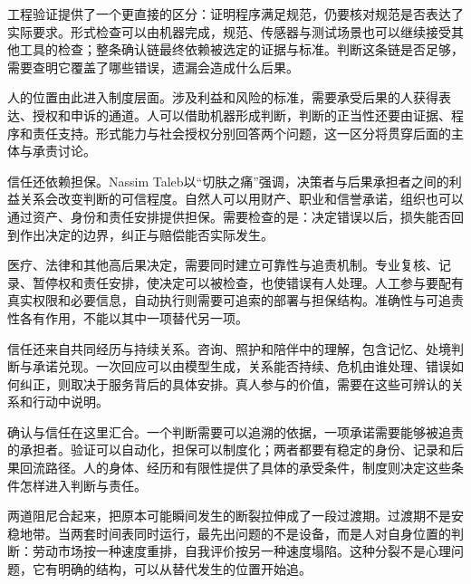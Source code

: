 工程验证提供了一个更直接的区分：证明程序满足规范，仍要核对规范是否表达了实际要求。形式检查可以由机器完成，规范、传感器与测试场景也可以继续接受其他工具的检查；整条确认链最终依赖被选定的证据与标准。判断这条链是否足够，需要查明它覆盖了哪些错误，遗漏会造成什么后果。

人的位置由此进入制度层面。涉及利益和风险的标准，需要承受后果的人获得表达、授权和申诉的通道。人可以借助机器形成判断，判断的正当性还要由证据、程序和责任支持。形式能力与社会授权分别回答两个问题，这一区分将贯穿后面的主体与承责讨论。


信任还依赖担保。Nassim Taleb以“切肤之痛”强调，决策者与后果承担者之间的利益关系会改变判断的可信程度。自然人可以用财产、职业和信誉承诺，组织也可以通过资产、身份和责任安排提供担保。需要检查的是：决定错误以后，损失能否回到作出决定的边界，纠正与赔偿能否实际发生。

医疗、法律和其他高后果决定，需要同时建立可靠性与追责机制。专业复核、记录、暂停权和责任安排，使决定可以被检查，也使错误有人处理。人工参与要配有真实权限和必要信息，自动执行则需要可追索的部署与担保结构。准确性与可追责性各有作用，不能以其中一项替代另一项。

信任还来自共同经历与持续关系。咨询、照护和陪伴中的理解，包含记忆、处境判断与承诺兑现。一次回应可以由模型生成，关系能否持续、危机由谁处理、错误如何纠正，则取决于服务背后的具体安排。真人参与的价值，需要在这些可辨认的关系和行动中说明。

确认与信任在这里汇合。一个判断需要可以追溯的依据，一项承诺需要能够被追责的承担者。验证可以自动化，担保可以制度化；两者都要有稳定的身份、记录和后果回流路径。人的身体、经历和有限性提供了具体的承受条件，制度则决定这些条件怎样进入判断与责任。

两道阻尼合起来，把原本可能瞬间发生的断裂拉伸成了一段过渡期。过渡期不是安稳地带。当两套时间表同时运行，最先出问题的不是设备，而是人对自身位置的判断：劳动市场按一种速度重排，自我评价按另一种速度塌陷。这种分裂不是心理问题，它有明确的结构，可以从替代发生的位置开始追。
